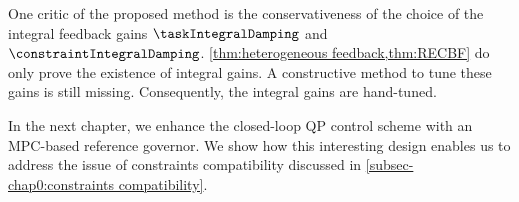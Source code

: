 One critic of the proposed method is the conservativeness of the choice of the integral feedback gains $\taskIntegralDamping$ and $\constraintIntegralDamping$. \cref{thm:heterogeneous feedback,thm:RECBF} do only prove the existence of integral gains. A constructive method to tune these gains is still missing. Consequently, the integral gains are hand-tuned. 

In the next chapter, we enhance the closed-loop QP control scheme with an MPC-based reference governor. We  show how this interesting design enables us to address the issue of constraints compatibility discussed in \cref{subsec-chap0:constraints compatibility}. 

